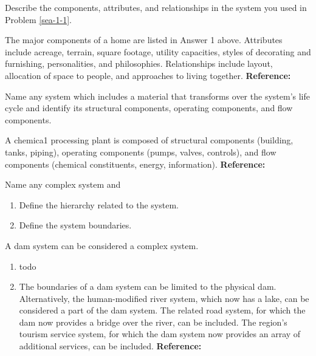 \begin{exercises}
    \begin{exercise} 
    \label{sea-1-2}
        Describe the components, attributes, and relationships in the system you used in Problem \ref{sea-1-1}.
    \end{exercise}
    \begin{solution}
        The major components of a home are listed in Answer 1 above. Attributes include acreage, terrain, square footage, utility capacities, styles of decorating and furnishing, personalities, and philosophies. Relationships include layout, allocation of space to people, and approaches to living together. \textbf{Reference:}
    \end{solution}
    
    \begin{exercise}
    \label{sea-1-3}
        Name any system which includes a material that transforms over the system's life cycle and identify its structural components, operating components, and flow components.
    \end{exercise}
    \begin{solution}
        A chemica1 processing plant is composed of structural components (building, tanks, piping), operating components (pumps, valves, controls), and flow components (chemical constituents, energy, information). \textbf{Reference:}
    \end{solution}
    
    \begin{exercise} 
    \label{sea-1-4_5}
        Name any complex system and
        \begin{enumerate}[label=\alph*)]
            \item Define the hierarchy related to the system.
            \item Define the system boundaries.
        \end{enumerate}
    \end{exercise}
    \begin{solution}
        A dam system can be considered a complex system.
        \begin{enumerate}[label=\alph*)]
            \item todo
            \item The boundaries of a dam system can be limited to the physical dam. Alternatively, the human-modified river system, which now has a lake, can be considered a part of the dam system. The related road system, for which the dam now provides a bridge over the river, can be included. The region’s tourism service system, for which the dam system now provides an array of additional services, can be included. \textbf{Reference:}
        \end{enumerate}
    \end{solution}
    

\end{exercises}
